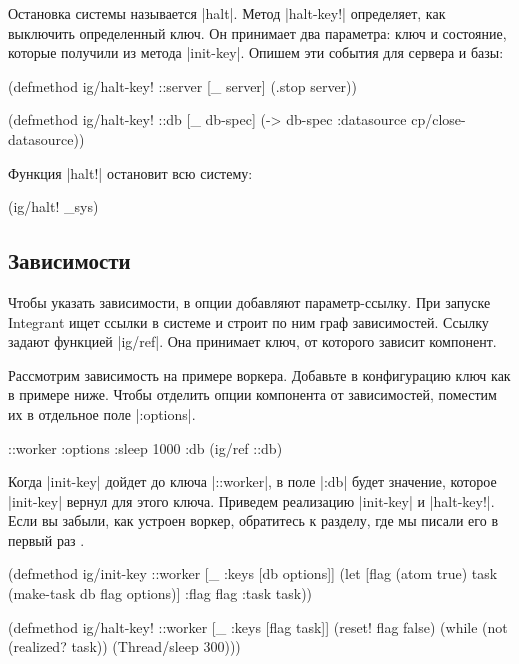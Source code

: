 Остановка системы называется \spverb|halt|. Метод \spverb|halt-key!| определяет,
как выключить определенный ключ. Он принимает два параметра: ключ и состояние,
которые получили из метода \spverb|init-key|. Опишем эти события для сервера и
базы:

\begin{english}
  \begin{clojure}
(defmethod ig/halt-key! ::server
  [_ server]
  (.stop server))

(defmethod ig/halt-key! ::db
  [_ db-spec]
  (-> db-spec :datasource cp/close-datasource))
  \end{clojure}
\end{english}

Функция \spverb|halt!| остановит всю систему:

\begin{english}
  \begin{clojure}
(ig/halt! _sys)
  \end{clojure}
\end{english}

\subsection{Зависимости}

Чтобы указать зависимости, в опции добавляют параметр-ссылку. При запуске
Integrant ищет ссылки в системе и строит по ним граф зависимостей. Ссылку задают
функцией \spverb|ig/ref|. Она принимает ключ, от которого зависит компонент.

Рассмотрим зависимость на примере воркера. Добавьте в конфигурацию ключ как в
примере ниже. Чтобы отделить опции компонента от зависимостей, поместим их в
отдельное поле \spverb|:options|.

\begin{english}
  \begin{clojure}
{::worker {:options {:sleep 1000}
           :db (ig/ref ::db)}}
  \end{clojure}
\end{english}

Когда \spverb|init-key| дойдет до ключа \spverb|::worker|, в поле \spverb|:db|
будет значение, которое \spverb|init-key| вернул для этого ключа. Приведем
реализацию \spverb|init-key| и \spverb|halt-key!|. Если вы забыли, как устроен
воркер, обратитесь к разделу, где мы писали его в первый раз .

\begin{english}
  \begin{clojure}
(defmethod ig/init-key ::worker
  [_ {:keys [db options]}]
  (let [flag (atom true)
        task (make-task db flag options)]
    {:flag flag :task task}))

(defmethod ig/halt-key! ::worker
  [_ {:keys [flag task]}]
  (reset! flag false)
  (while (not (realized? task))
    (Thread/sleep 300)))
  \end{clojure}
\end{english}

